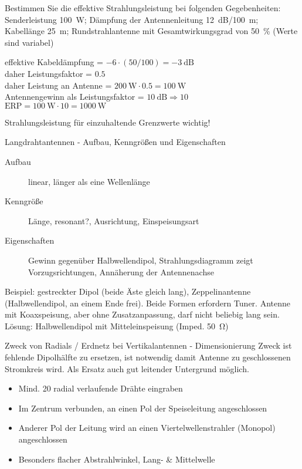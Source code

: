 \documentclass[avery5371,grid,frame,a4paper]{flashcards}
\newcommand{\card}[3]{
  \begin{flashcard}[{\chap} -- #1]{#2}#3\end{flashcard}
}
\begin{document}
\card{80}{Bestimmen Sie die effektive Strahlungsleistung bei folgenden Gegebenheiten: Senderleistung \SI{100}{\watt}; Dämpfung der Antennenleitung \SI{12}{\dB}/\SI{100}{\metre}; Kabellänge \SI{25}{\metre}; Rundstrahlantenne mit Gesamtwirkungsgrad von \SI{50}{\percent} (Werte sind variabel)}{
  \item
  effektive Kabeldämpfung = $-6\cdot (50/100) = \SI{-3}{\dB}$ \\
  daher Leistungsfaktor = $0.5$ \\
  daher Leistung an Antenne = $\SI{200}{\watt} \cdot 0.5 = \SI{100}\watt$ \\
  Antennengewinn als Leistungsfaktor = $\SI{10}{\dB} \Rightarrow 10$ \\
  $\text{ERP} = \SI{100}{\watt} \cdot 10 = \SI{1000}{\watt}$

  \item
  Strahlungsleistung für einzuhaltende Grenzwerte wichtig!
}
\card{81}{Langdrahtantennen - Aufbau, Kenngrößen und Eigenschaften}{
  \small
  \begin{description}
    \item[Aufbau]
      linear, länger als eine Wellenlänge
    \item[Kenngröße]
      {\footnotesize Länge, resonant?, Ausrichtung, Einspeisungsart}
    \item[Eigenschaften]
      Gewinn gegenüber Halbwellendipol,
      Strahlungsdiagramm zeigt Vorzugsrichtungen,
      Annäherung der Antennenachse
  \end{description}

  Beispiel: gestreckter Dipol (beide Äste gleich lang), Zeppelinantenne (Halbwellendipol, an einem Ende frei).
  Beide Formen erfordern Tuner.
  Antenne mit Koaxspeisung, aber ohne Zusatzanpassung, darf nicht beliebig lang sein.
  Lösung: Halbwellendipol mit Mitteleinspeisung (Imped. \SI{50}{\ohm})
}
\card{82}{Zweck von Radials / Erdnetz bei Vertikalantennen - Dimensionierung}{
  \small
  Zweck ist fehlende Dipolhälfte zu ersetzen, ist notwendig damit Antenne zu geschlossenen Stromkreis wird. Als Ersatz auch gut leitender Untergrund möglich.

  \begin{itemize}
    \item Mind. 20 radial verlaufende Drähte eingraben
    \item Im Zentrum verbunden, an einen Pol der Speiseleitung angeschlossen
    \item Anderer Pol der Leitung wird an einen Viertelwellenstrahler (Monopol) angeschlossen
    \item Besonders flacher Abstrahlwinkel, Lang- \& Mittelwelle
  \end{itemize}
}
\end{document}
